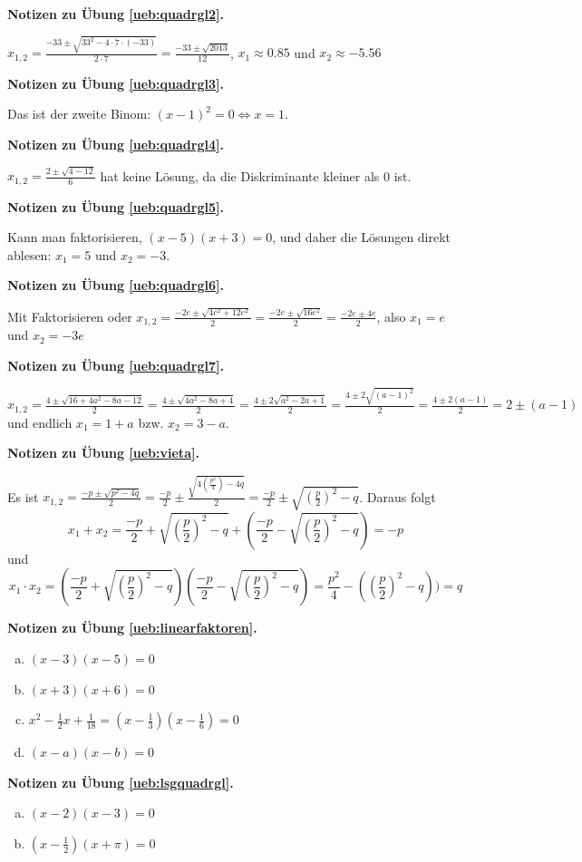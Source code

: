 \documentclass[%
11pt,%
twoside,%
titlepage,%
swissgerman,%
headsepline%
]{scrartcl}
\newcommand{\faReturnGray}{\textcolor{gray}{\faMailReply}} %
\theoremstyle{definition}
\theoremstyle{plain}
\newcommand{\concatueb}[1]{ueb:#1}%
\newcommand{\concatlsg}[1]{lsg:#1}%
\newenvironment{lsg}[1]{%
    \par\noindent\textbf{Notizen zu Übung \ref{\concatueb{#1}}.}%
    \label{\concatlsg{#1}} %
    \hfill\hyperref[\concatueb{#1}]{\faReturnGray}\par %
}{%
    \par%
}
\begin{document}
\begin{lsg}{quadrgl2}
    $x_{1,2}=\frac{-33\pm\sqrt{33^2-4\cdot7\cdot(-33)}}{2\cdot7}=\frac{-33\pm\sqrt{2013}}{12}$, $x_1\approx0.85$ und $x_2\approx-5.56$
\end{lsg}

\begin{lsg}{quadrgl3}
    Das ist der zweite Binom: $(x-1)^2=0\Leftrightarrow x=1$.
\end{lsg}

\begin{lsg}{quadrgl4}
    $x_{1,2}=\frac{2\pm\sqrt{4-12}}{6}$ hat keine Lösung, da die Diskriminante kleiner als 0 ist.
\end{lsg}

\begin{lsg}{quadrgl5}
    Kann man faktorisieren, $(x-5)(x+3)=0$, und daher die Lösungen direkt ablesen: $x_1=5$ und $x_2=-3$.
\end{lsg}

\begin{lsg}{quadrgl6}
    Mit Faktorisieren oder $x_{1,2}=\frac{-2e\pm\sqrt{4e^2+12e^2}}{2}=\frac{-2e\pm\sqrt{16e^2}}{2}=\frac{-2e\pm4e}{2}$, also $x_1=e$ und $x_2=-3e$
\end{lsg}

\begin{lsg}{quadrgl7}
    $x_{1,2}=\frac{4\pm\sqrt{16+4a^2-8a-12}}{2}=\frac{4\pm\sqrt{4a^2-8a+4}}{2}=\frac{4\pm2\sqrt{a^2-2a+1}}{2}=\frac{4\pm2\sqrt{(a-1)^2}}{2}=\frac{4\pm2(a-1)}{2}=2\pm(a-1)$ und endlich $x_1=1+a$ bzw. $x_2=3-a$.
\end{lsg}

\begin{lsg}{vieta}
    Es ist $x_{1,2}=\frac{-p\pm\sqrt{p^2-4q}}{2}=\frac{-p}{2}\pm\frac{\sqrt{4(\frac{p^2}{4})-4q}}{2}=\frac{-p}{2}\pm\sqrt{(\frac{p}{2})^2-q}$. Daraus folgt
    $$x_1+x_2=\frac{-p}{2}+\sqrt{(\frac{p}{2})^2-q}+\left(\frac{-p}{2}-\sqrt{(\frac{p}{2})^2-q}\right)=-p$$
    und
    $$x_1\cdot x_2=\left(\frac{-p}{2}+\sqrt{(\frac{p}{2})^2-q}\right)\left(\frac{-p}{2}-\sqrt{(\frac{p}{2})^2-q}\right)=\frac{p^2}{4}-((\frac{p}{2})^2-q))=q$$
\end{lsg}

\begin{lsg}{linearfaktoren}
    \begin{enumerate}[a)]
        \item $(x-3)(x-5)=0$
        \item $(x+3)(x+6)=0$
        \item $x^2-\frac{1}{2}x+\frac{1}{18}=(x-\frac{1}{3})(x-\frac{1}{6})=0$
        \item $(x-a)(x-b)=0$
    \end{enumerate}
\end{lsg}
\begin{lsg}{lsgquadrgl}
    \begin{enumerate}[a)]
        \item $(x-2)(x-3)=0$
        \item $(x-\tfrac{1}{2})(x+\pi)=0$
    \end{enumerate}
\end{lsg}
\end{document}
